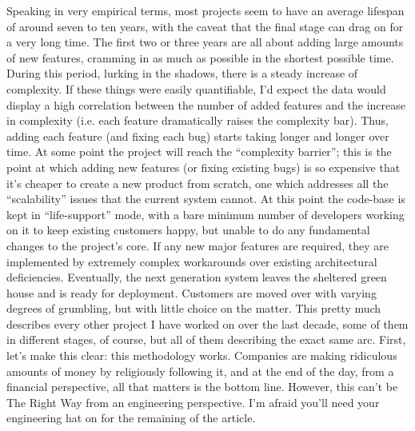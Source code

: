 \documentclass{book}
\begin{document}
Speaking in very empirical terms, most projects seem to have an
average lifespan of around seven to ten years, with the caveat that
the final stage can drag on for a very long time. The first two or
three years are all about adding large amounts of new features,
cramming in as much as possible in the shortest possible time. During
this period, lurking in the shadows, there is a steady increase of
complexity. If these things were easily quantifiable, I'd expect the
data would display a high correlation between the number of added
features and the increase in complexity (i.e. each feature
dramatically raises the complexity bar). Thus, adding each feature
(and fixing each bug) starts taking longer and longer over time. At
some point the project will reach the ``complexity barrier''; this is
the point at which adding new features (or fixing existing bugs) is so
expensive that it's cheaper to create a new product from scratch, one
which addresses all the ``scalability'' issues that the current system
cannot. At this point the code-base is kept in ``life-support'' mode,
with a bare minimum number of developers working on it to keep
existing customers happy, but unable to do any fundamental changes to
the project's core. If any new major features are required, they are
implemented by extremely complex workarounds over existing
architectural deficiencies. Eventually, the next generation system
leaves the sheltered green house and is ready for
deployment. Customers are moved over with varying degrees of
grumbling, but with little choice on the matter. This pretty much
describes every other project I have worked on over the last decade,
some of them in different stages, of course, but all of them
describing the exact same arc. First, let's make this clear: this
methodology works. Companies are making ridiculous amounts of money by
religiously following it, and at the end of the day, from a financial
perspective, all that matters is the bottom line. However, this can't
be The Right Way from an engineering perspective. I'm afraid you'll
need your engineering hat on for the remaining of the article.
\end{document}
